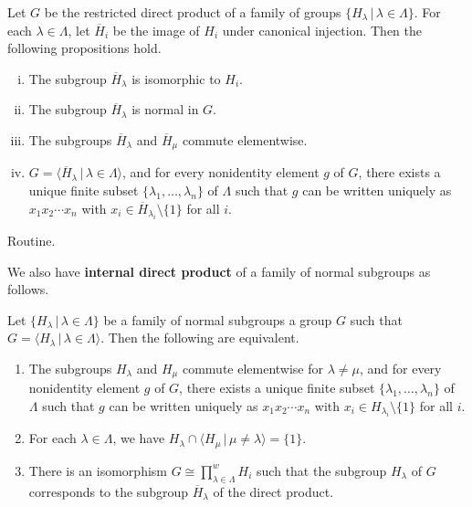 \begin{proposition}
	Let $G$ be the restricted direct product of a family of groups $\{H_\lambda\,|\, \lambda \in \Lambda\}$. For each $\lambda\in \Lambda$,  let $\overline{H}_i$ be the image of $H_i$ under canonical injection. Then the following propositions hold.
	\begin{enumerate}[(i)]
		\item The subgroup $\overline{H}_\lambda$ is isomorphic to $H_i$.
		\item The subgroup $\overline{H}_\lambda$ is normal in $G$.
		\item The subgroups $\overline{H}_\lambda$ and $\overline{H}_\mu$ commute elementwise.
		\item $G = \langle \overline{H}_\lambda \,|\, \lambda\in\Lambda \rangle$, and for  every nonidentity element $g$ of $G$, there exists a unique finite subset $\{\lambda_1,\dots, \lambda_n\}$ of $\Lambda$ such that $g$ can be written uniquely as $x_1 x_2 \cdots x_n$ with $x_i \in \overline{H}_{\lambda_i}\setminus\{1\}$ for all $i$.
	\end{enumerate}
\end{proposition}
\begin{sketch}
	Routine.
\end{sketch}
We also have \textbf{internal direct product} of a family of normal subgroups as follows.
\begin{theorem}
	Let $\{H_\lambda\,|\, \lambda \in \Lambda\}$ be a family of normal subgroups a group $G$ such that $G = \langle H_\lambda\,|\, \lambda \in \Lambda \rangle$. Then the following  are equivalent.
	\begin{enumerate}[(1)]
		\item The subgroups $H_\lambda$ and $H_\mu$ commute elementwise for $\lambda\neq \mu$, and for  every nonidentity element $g$ of $G$, there exists a unique finite subset $\{\lambda_1,\dots, \lambda_n\}$ of $\Lambda$ such that $g$ can be written uniquely as $x_1 x_2 \cdots x_n$ with $x_i \in H_{\lambda_i}\setminus\{1\}$ for all $i$.
		\item For each $\lambda\in\Lambda$, we have $H_\lambda \cap \langle H_\mu\,|\, \mu \neq \lambda \rangle= \{1\}$.
		\item There is an isomorphism $G \cong \prod_{\lambda\in \Lambda}^w H_i$ such that the subgroup $H_\lambda$ of $G$ corresponds to the subgroup $\overline{H}_\lambda$ of the direct product.
	\end{enumerate}
\end{theorem}
